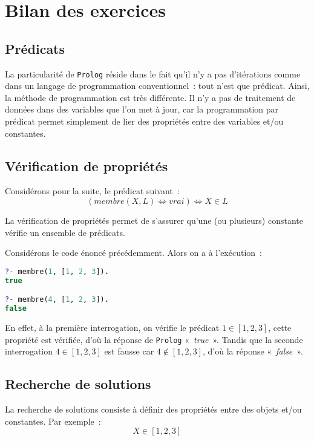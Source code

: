 \chapter{Bilan des exercices}

\section{Prédicats}

La particularité de \texttt{Prolog} réside dans le fait qu'il n'y a pas d'itérations comme
dans un langage de programmation conventionnel~: tout n'est que prédicat. Ainsi, la
méthode de programmation est très différente. Il n'y a pas de traitement de données
dans des variables que l'on met à jour, car la programmation par prédicat permet
simplement de lier des propriétés entre des variables et/ou constantes.

\section{Vérification de propriétés}
Considérons pour la suite, le prédicat suivant~:
\[(membre(X, L) \Leftrightarrow vrai) \Leftrightarrow X \in L\]


La vérification de propriétés permet de s'assurer qu'une (ou plusieurs) constante
vérifie un ensemble de prédicats.

Considérons le code énoncé précédemment. Alors on a à l'exécution~:

\begin{lstlisting}[language=Prolog,frame=single]
?- membre(1, [1, 2, 3]).
true

?- membre(4, [1, 2, 3]).
false
\end{lstlisting}

En effet, à la première interrogation, on vérifie le prédicat $1 \in [1, 2, 3]$,
cette propriété est vérifiée, d'où la réponse de \texttt{Prolog} «~\textit{true}~». Tandis que la seconde interrogation $4 \in [1, 2, 3]$ est fausse car
$4 \notin [1, 2, 3]$, d'où la réponse «~\textit{false}~».


\section{Recherche de solutions}

La recherche de solutions consiste à définir des propriétés entre des objets et/ou constantes. Par exemple~:
\[
	X \in [1, 2, 3]
\]

\pagebreak

